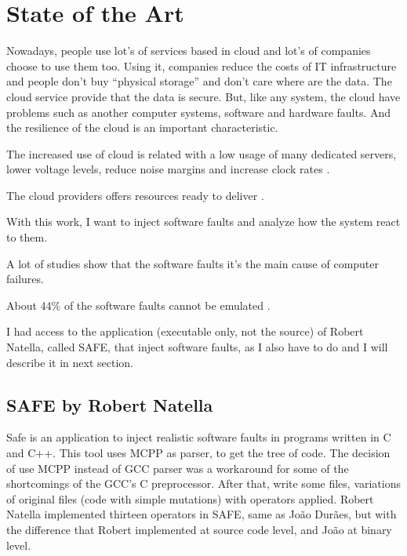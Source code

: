 \newpage
\section{State of the Art}

Nowadays, people use lot's of services based in cloud and lot's of companies choose to use them too. Using it, companies reduce the costs of IT infrastructure and people don't buy ``physical storage'' and don't care where are the data. The cloud service provide that the data is secure.
But, like any system, the cloud have problems such as another computer systems, software and hardware faults. And the resilience of the cloud is an important characteristic.

The increased use of cloud is related with a low usage of many dedicated servers, lower voltage levels, reduce noise margins and increase clock rates \cite{wolter2012resilience}.

The cloud providers offers resources ready to deliver \cite{wolter2012resilience}.

With this work, I want to inject software faults and analyze how the system react to them.

A lot of studies show that the software faults\cite{avizzienisbasic} it's the main cause of computer failures.


About 44\% of the software faults cannot be emulated \cite{madeira2000emulation}.


I had access to the application (executable only, not the source) of Robert Natella, called SAFE, that inject software faults, as I also have to do and I will describe it in next section.

\subsection{SAFE by Robert Natella}
Safe is an application to inject realistic software faults in programs written in C and C++.
This tool uses MCPP as parser, to get the tree of code. The decision of use MCPP instead of GCC parser was a workaround for some of the shortcomings of the GCC's C preprocessor.
After that, write some files, variations of original files (code with simple mutations) with operators applied.
Robert Natella implemented thirteen operators in SAFE, same as João Durães\cite{duraes2006emulation}, but with the difference that Robert implemented at source code level, and João at binary level.

